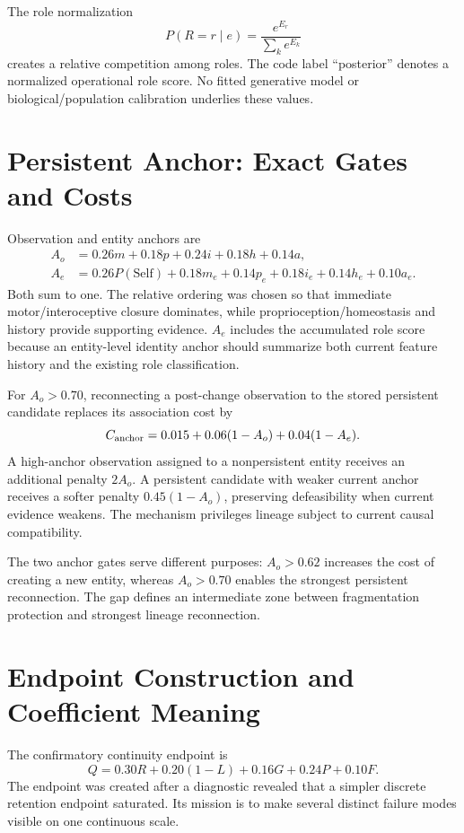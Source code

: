 \documentclass[10pt,journal,onecolumn]{IEEEtran}
\newcommand{\Self}{\mathrm{Self}}
\begin{document}
The role normalization
\begin{equation}
P(R=r\mid e)=\frac{e^{E_r}}{\sum_ke^{E_k}}
\end{equation}
creates a relative competition among roles. The code label ``posterior'' denotes a normalized operational role score. No fitted generative model or biological/population calibration underlies these values.

\section{Persistent Anchor: Exact Gates and Costs}
Observation and entity anchors are
\begin{align}
A_o&=0.26m+0.18p+0.24i+0.18h+0.14a,\\
A_e&=0.26P(\Self)+0.18m_e+0.14p_e+0.18i_e+0.14h_e+0.10a_e.
\end{align}
Both sum to one. The relative ordering was chosen so that immediate motor/interoceptive closure dominates, while proprioception/homeostasis and history provide supporting evidence. $A_e$ includes the accumulated role score because an entity-level identity anchor should summarize both current feature history and the existing role classification.

For $A_o>0.70$, reconnecting a post-change observation to the stored persistent candidate replaces its association cost by
\begin{equation}
C_{\rm anchor}=0.015+0.06(1-A_o)+0.04(1-A_e).
\end{equation}
A high-anchor observation assigned to a nonpersistent entity receives an additional penalty $2A_o$. A persistent candidate with weaker current anchor receives a softer penalty $0.45(1-A_o)$, preserving defeasibility when current evidence weakens. The mechanism privileges lineage subject to current causal compatibility.

The two anchor gates serve different purposes: $A_o>0.62$ increases the cost of creating a new entity, whereas $A_o>0.70$ enables the strongest persistent reconnection. The gap defines an intermediate zone between fragmentation protection and strongest lineage reconnection.

\section{Endpoint Construction and Coefficient Meaning}
The confirmatory continuity endpoint is
\begin{equation}
Q=0.30R+0.20(1-L)+0.16G+0.24P+0.10F.
\end{equation}
The endpoint was created after a diagnostic revealed that a simpler discrete retention endpoint saturated. Its mission is to make several distinct failure modes visible on one continuous scale.
\end{document}
